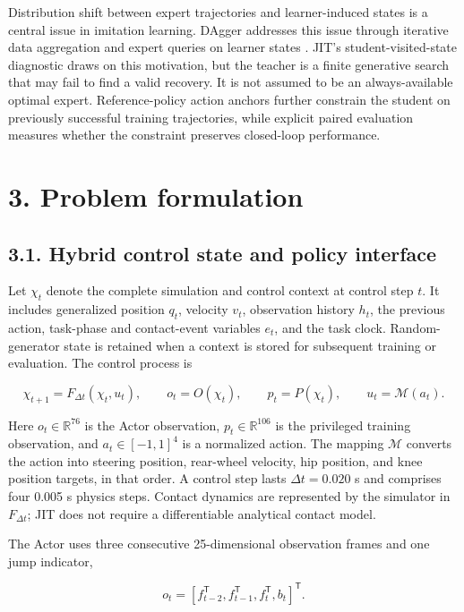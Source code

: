 \documentclass[
  american,
  11pt,
  a4paper,
]{article}
\begin{document}
Distribution shift between expert trajectories and learner-induced
states is a central issue in imitation learning. DAgger addresses this
issue through iterative data aggregation and expert queries on learner
states \cite{ross2011dagger}. JIT's student-visited-state diagnostic draws on this
motivation, but the teacher is a finite generative search that may fail
to find a valid recovery. It is not assumed to be an always-available
optimal expert. Reference-policy action anchors further constrain the
student on previously successful training trajectories, while explicit
paired evaluation measures whether the constraint preserves closed-loop
performance.

\section{3. Problem formulation}\label{problem-formulation}

\subsection{3.1. Hybrid control state and policy
interface}\label{hybrid-control-state-and-policy-interface}

Let \(\chi_t\) denote the complete simulation and control context at
control step \(t\). It includes generalized position \(q_t\), velocity
\(v_t\), observation history \(h_t\), the previous action, task-phase
and contact-event variables \(e_t\), and the task clock.
Random-generator state is retained when a context is stored for
subsequent training or evaluation. The control process is

\[
\chi_{t+1}=F_{\Delta t}(\chi_t,u_t),\qquad
o_t=O(\chi_t),\qquad p_t=P(\chi_t),\qquad u_t=\mathcal M(a_t).
\tag{1}\label{eq:1}
\]

Here \(o_t\in\mathbb R^{76}\) is the Actor observation,
\(p_t\in\mathbb R^{106}\) is the privileged training observation, and
\(a_t\in[-1,1]^4\) is a normalized action. The mapping \(\mathcal M\)
converts the action into steering position, rear-wheel velocity, hip
position, and knee position targets, in that order. A control step lasts
\(\Delta t=0.020\) s and comprises four 0.005 s physics steps. Contact
dynamics are represented by the simulator in \(F_{\Delta t}\); JIT does
not require a differentiable analytical contact model.

The Actor uses three consecutive 25-dimensional observation frames and
one jump indicator,

\[
o_t=[f_{t-2}^{\mathsf T},f_{t-1}^{\mathsf T},f_t^{\mathsf T},b_t]^{\mathsf T}.
\tag{2}\label{eq:2}
\]
\end{document}
